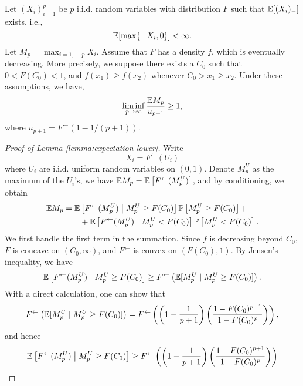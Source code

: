 \begin{lemma} \label{lemma:expectation-lower}
Let $(X_i)_{i=1}^p$ be $p$ i.i.d. random variables with distribution $F$ such that ${\mathbb E}[(X_i)_-]$ exists, i.e.,
$$
{\mathbb E}[\max\{-X_i, 0\}] < \infty.
$$
Let $M_p = \max_{i=1,\ldots,p}X_i$. Assume that $F$ has a density $f$, which is eventually decreasing. 
More precisely, we suppose there exists a 
$C_0$ such that $0<F(C_0)<1$, and $f(x_1) \ge f(x_2)$ whenever $C_0 > x_1 \ge x_2$. 
Under these assumptions, we have,
$$
\liminf_{p\to\infty}\frac{{\mathbb E} M_p}{u_{p+1}} \ge 1,
$$
where $u_{p+1} = F^{\leftarrow}(1 - 1/(p+1))$.
\end{lemma}

\begin{proof}[Proof of Lemma \ref{lemma:expectation-lower}]
Write 
$$
X_i = F^{\leftarrow}(U_i)
$$
where $U_i$ are i.i.d. uniform random variables on $(0,1)$.
Denote $M^{U}_p$ as the maximum of the $U_i$'s, we have ${\mathbb E} M_p = {\mathbb E}\left[F^{\leftarrow}(M^{U}_p)\right]$, and by conditioning, we obtain
\begin{align} \label{eq:lemma:expectation-lower-proof-1}
    \E M_p &= \E\left[F^{\leftarrow}(M^{U}_p)\;\big|\;M^{U}_p \ge F(C_0)\right] \P\left[M^{U}_p \ge F(C_0)\right] + \nonumber \\ 
           &\quad\quad +\E\left[F^{\leftarrow}(M^{U}_p)\;\big|\;M^{U}_p < F(C_0)\right] \P\left[M^{U}_p < F(C_0)\right]. 
\end{align} 
We first handle the first term in the summation. Since $f$ is decreasing beyond $C_0$, $F$ is concave on $(C_0, \infty)$, and $F^{\leftarrow}$ is convex on $(F(C_0), 1)$. By Jensen's inequality, we have
\begin{equation*}
    \E\left[F^{\leftarrow}(M^{U}_p)\;\big|\;M^{U}_p \ge F(C_0)\right] 
        \ge F^{\leftarrow}\left(\E[M^{U}_p\;|\;M^{U}_p\ge F(C_0)]\right).
\end{equation*}
With a direct calculation, one can show that 
\begin{equation*}
    F^{\leftarrow}\left(\E[M^{U}_p\;|\;M^{U}_p\ge F(C_0)]\right)
    = F^{\leftarrow}\left(\left(1-\frac{1}{p+1}\right)\left(\frac{1-F(C_0)^{p+1}}{1-F(C_0)^{p}}\right)\right),
\end{equation*}
and hence
\begin{align*}
    \E\left[F^{\leftarrow}(M^{U}_p)\;\big|\;M^{U}_p \ge F(C_0)\right] 
        &\ge F^{\leftarrow}\left(\left(1-\frac{1}{p+1}\right)\left(\frac{1-F(C_0)^{p+1}}{1-F(C_0)^{p}}\right)\right) \\

\end{align*}
\end{proof}
